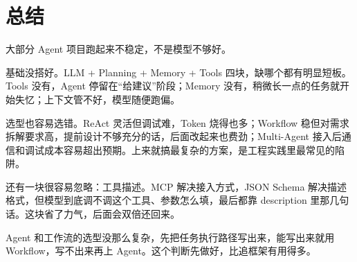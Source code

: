\documentclass[9pt,a4paper,twocolumn]{ctexart}
\begin{document}
\section*{总结}


大部分 Agent 项目跑起来不稳定，不是模型不够好。



基础没搭好。LLM + Planning + Memory + Tools 四块，缺哪个都有明显短板。Tools 没有，Agent 停留在“给建议”阶段；Memory 没有，稍微长一点的任务就开始失忆；上下文管不好，模型随便跑偏。



选型也容易选错。ReAct 灵活但调试难，Token 烧得也多；Workflow 稳但对需求拆解要求高，提前设计不够充分的话，后面改起来也费劲；Multi-Agent 接入后通信和调试成本容易超出预期。上来就搞最复杂的方案，是工程实践里最常见的陷阱。



还有一块很容易忽略：工具描述。MCP 解决接入方式，JSON Schema 解决描述格式，但模型到底调不调这个工具、参数怎么填，最后都靠 description 里那几句话。这块省了力气，后面会双倍还回来。



Agent 和工作流的选型没那么复杂，先把任务执行路径写出来，能写出来就用 Workflow，写不出来再上 Agent。这个判断先做好，比追框架有用得多。
\end{document}
